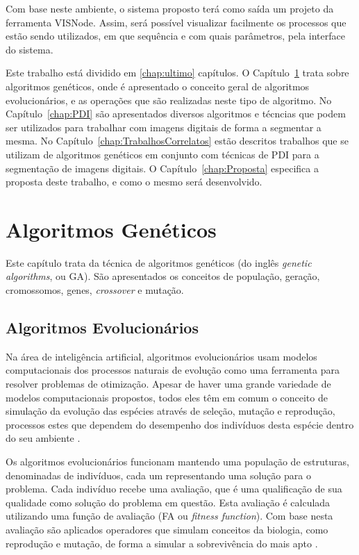 \documentclass[12pt,oneside,a4paper,english,french,spanish,brazil,]{abntex2}
\begin{document}
Com base neste ambiente, o sistema proposto terá como saída um projeto da ferramenta VISNode. Assim, será possível visualizar facilmente os processos que estão sendo utilizados, em que sequência e com quais parâmetros, pela interface do sistema.

Este trabalho está dividido em \ref{chap:ultimo} capítulos. O Capítulo~\ref{chap:AlgoritmosGeneticos} trata sobre algoritmos genéticos, onde é apresentado o conceito geral de algoritmos evolucionários, e as operações que são realizadas neste tipo de algoritmo. No Capítulo~\ref{chap:PDI} são apresentados diversos algoritmos e técncias que podem ser utilizados para trabalhar com imagens digitais de forma a segmentar a mesma. No Capítulo~\ref{chap:TrabalhosCorrelatos} estão descritos trabalhos que se utilizam de algoritmos genéticos em conjunto com técnicas de PDI para a segmentação de imagens digitais. O Capítulo~\ref{chap:Proposta} especifica a proposta deste trabalho, e como o mesmo será desenvolvido.


\chapter{Algoritmos Genéticos}
\label{chap:AlgoritmosGeneticos}

Este capítulo trata da técnica de algoritmos genéticos (do inglês \textit{genetic algorithms}, ou GA). São apresentados os conceitos de população, geração, cromossomos, genes, \textit{crossover} e mutação.

\section{Algoritmos Evolucionários}

Na área de inteligência artificial, algoritmos evolucionários usam modelos computacionais dos processos naturais de evolução como uma ferramenta para resolver problemas de otimização. Apesar de haver uma grande variedade de modelos computacionais propostos, todos eles têm em comum o conceito de simulação da evolução das espécies através de seleção, mutação e reprodução, processos estes que dependem do desempenho dos indivíduos desta espécie dentro do seu ambiente \cite{linden:2008}.

Os algoritmos evolucionários funcionam mantendo uma população de estruturas, denominadas de indivíduos, cada um representando uma solução para o problema. Cada indivíduo recebe uma avaliação, que é uma qualificação de sua qualidade como solução do problema em questão. Esta avaliação é calculada utilizando uma função de avaliação (FA ou \textit{fitness function}). Com base nesta avaliação são aplicados operadores que simulam conceitos da biologia, como reprodução e mutação, de forma a simular a sobrevivência do mais apto \cite{linden:2008}.
\end{document}
